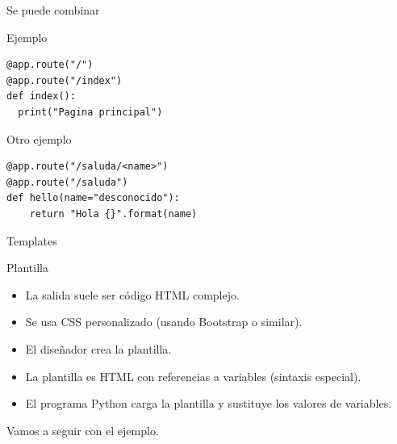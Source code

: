 \documentclass[bigger,unknownkeysallowed]{beamer}
\begin{document}
\begin{frame}[fragile,label={sec:org90ab09f}]{Se puede combinar}
 \begin{exampleblock}{Ejemplo}
\lstset{language=Python,label= ,caption= ,captionpos=b,numbers=none}
\begin{lstlisting}
@app.route("/")
@app.route("/index")
def index():
  print("Pagina principal")
\end{lstlisting}
\end{exampleblock}

\begin{exampleblock}{Otro ejemplo}
\lstset{language=Python,label= ,caption= ,captionpos=b,numbers=none}
\begin{lstlisting}
@app.route("/saluda/<name>")
@app.route("/saluda")
def hello(name="desconocido"):
    return "Hola {}".format(name)
\end{lstlisting}
\end{exampleblock}
\end{frame}

\begin{frame}[label={sec:org2ade2d0}]{Templates}
\begin{block}{Plantilla}
\begin{itemize}
\item La salida suele ser código HTML complejo.
\item Se usa CSS personalizado (usando Bootstrap o similar).
\item El diseñador crea la plantilla.
\item La plantilla es HTML con referencias a variables (sintaxis especial).
\item El programa Python carga la plantilla y sustituye los valores de variables.
\end{itemize}
\end{block}

\begin{block}{}
Vamos a seguir con el ejemplo.
\end{block}
\end{frame}
\end{document}
